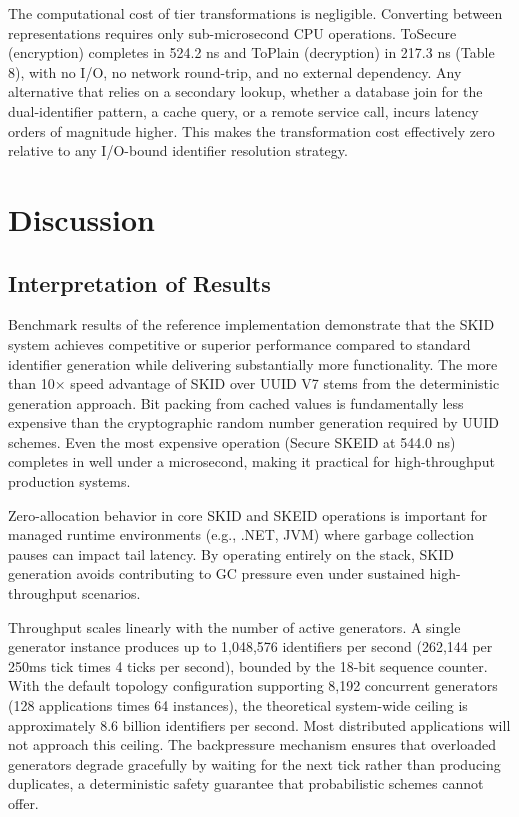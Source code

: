 \documentclass[fleqn,10pt]{wlpeerj}
\begin{document}
The computational cost of tier transformations is negligible. Converting
between representations requires only sub-microsecond CPU operations.
ToSecure (encryption) completes in 524.2 ns and ToPlain (decryption) in
217.3 ns (Table 8), with no I/O, no network round-trip, and no external
dependency. Any alternative that relies on a secondary lookup, whether a
database join for the dual-identifier pattern, a cache query, or a
remote service call, incurs latency orders of magnitude higher. This
makes the transformation cost effectively zero relative to any I/O-bound
identifier resolution strategy.

\section{Discussion}\label{discussion}

\subsection{Interpretation of Results}\label{interpretation-of-results}

Benchmark results of the reference implementation demonstrate that the
SKID system achieves competitive or superior performance compared to
standard identifier generation while delivering substantially more
functionality. The more than 10× speed advantage of SKID over UUID V7
stems from the deterministic generation approach. Bit packing from
cached values is fundamentally less expensive than the cryptographic
random number generation required by UUID schemes. Even the most
expensive operation (Secure SKEID at 544.0 ns) completes in well under a
microsecond, making it practical for high-throughput production systems.

Zero-allocation behavior in core SKID and SKEID operations is important
for managed runtime environments (e.g., .NET, JVM) where garbage
collection pauses can impact tail latency. By operating entirely on the
stack, SKID generation avoids contributing to GC pressure even under
sustained high-throughput scenarios.

Throughput scales linearly with the number of active generators. A
single generator instance produces up to 1,048,576 identifiers per
second (262,144 per 250ms tick times 4 ticks per second), bounded by the
18-bit sequence counter. With the default topology configuration
supporting 8,192 concurrent generators (128 applications times 64
instances), the theoretical system-wide ceiling is approximately 8.6
billion identifiers per second. Most distributed applications will not
approach this ceiling. The backpressure mechanism ensures that
overloaded generators degrade gracefully by waiting for the next tick
rather than producing duplicates, a deterministic safety guarantee that
probabilistic schemes cannot offer.
\end{document}
